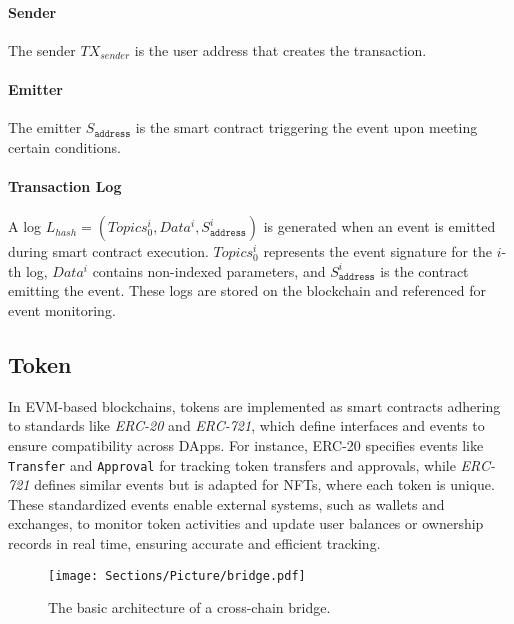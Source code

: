 \paragraph{Sender}
The sender \( TX_{\textit{sender}} \) is the user address that creates the transaction.

\paragraph{Emitter}
The emitter $S_{\texttt{address}}$ is the smart contract triggering the event upon meeting certain conditions.

\paragraph{Transaction Log}
A log \( L_{hash} = (Topics_0^i, \allowbreak{} Data^i,\allowbreak{} S_{\texttt{address}}^i) \) is
generated
when an event is emitted during smart contract execution. \( Topics_0^i \) represents the event
signature for the \(i\)-th log, \( Data^i \) contains non-indexed parameters, and \(
S_{\texttt{address}}^i \) is the contract emitting the event. These logs are stored on the
blockchain and referenced for event monitoring.


\subsection{Token}
In EVM-based blockchains, tokens are implemented as smart contracts adhering to standards like \textit{ERC-20} and \textit{ERC-721}, which define interfaces and events to ensure compatibility across DApps. For instance, ERC-20 specifies events like \texttt{Transfer} and \texttt{Approval} for tracking token transfers and approvals, while \textit{ERC-721} defines similar events but is adapted for NFTs, where each token is unique. These standardized events enable external systems, such as wallets and exchanges, to monitor token activities and update user balances or ownership records in real time, ensuring accurate and efficient tracking.

\begin{figure}[t]
    \centering
    \texttt{[image: Sections/Picture/bridge.pdf]}
    \caption{The basic architecture of a cross-chain bridge.}
    \label{fig:Bridge}
\end{figure}

